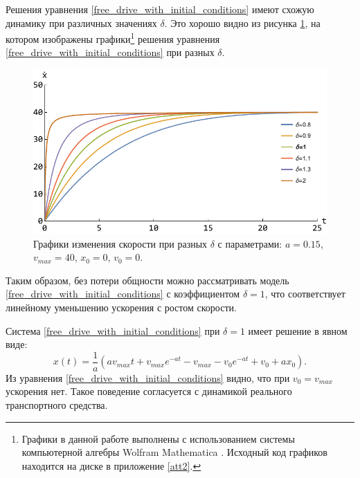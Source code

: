 \documentclass[12pt, a4paper]{extarticle}
\numberwithin{equation}{section}
\numberwithin{figure}{section}
\begin{document}
Решения уравнения \eqref{free_drive_with_initial_conditions} имеют схожую динамику при различных значениях $\delta$. Это хорошо видно из рисунка \ref{free_drive_with_delta}, на котором изображены графики\footnote{Графики в данной работе выполнены с использованием системы компьютерной алгебры Wolfram Mathematica \cite{WolframMathematica}. Исходный код графиков находится на диске в приложение \ref{att2}.} решения уравнения \eqref{free_drive_with_initial_conditions} при разных $\delta$.

\begin{figure}[h!]
	\begin{center}
		\begin{minipage}[h!]{0.48\linewidth}
			\includegraphics[width=1\linewidth,height=0.2\textheight]
			{Images/free_drive_speed_with_different_delta.pdf}
		\end{minipage}
		\caption{Графики изменения скорости при разных $\delta$ с параметрами: $a=0.15$, $v_{max}=40$, $x_0=0$, $v_0=0$.}
		\label{free_drive_with_delta}
	\end{center}
\end{figure}

Таким образом, без потери общности можно рассматривать модель \eqref{free_drive_with_initial_conditions} с коэффициентом $\delta=1$, что соответствует линейному уменьшению ускорения с ростом скорости.

Система \eqref{free_drive_with_initial_conditions} при $\delta=1$ имеет решение в явном виде:
\begin{equation*}
x(t) =\dfrac{1}{a}\left(av_{max}t+v_{max}e^{-at}-v_{max}-v_0e^{-at}+v_0+ax_0\right).
\end{equation*}
Из уравнения \eqref{free_drive_with_initial_conditions} видно, что при $v_0=v_{max}$ ускорения нет. Такое поведение согласуется с динамикой реального транспортного средства.
\end{document}
